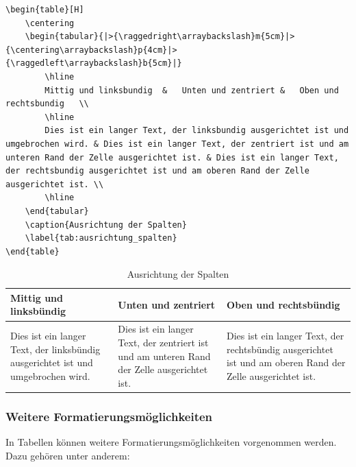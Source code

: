 \begin{lstlisting}[language={[LaTeX]TeX}, basicstyle=\footnotesize\ttfamily]
\begin{table}[H]
    \centering
    \begin{tabular}{|>{\raggedright\arraybackslash}m{5cm}|>{\centering\arraybackslash}p{4cm}|>{\raggedleft\arraybackslash}b{5cm}|}
        \hline
        Mittig und linksbundig  &   Unten und zentriert &   Oben und rechtsbundig   \\
        \hline
        Dies ist ein langer Text, der linksbundig ausgerichtet ist und umgebrochen wird. & Dies ist ein langer Text, der zentriert ist und am unteren Rand der Zelle ausgerichtet ist. & Dies ist ein langer Text, der rechtsbundig ausgerichtet ist und am oberen Rand der Zelle ausgerichtet ist. \\
        \hline
    \end{tabular}
    \caption{Ausrichtung der Spalten}
    \label{tab:ausrichtung_spalten}
\end{table}
\end{lstlisting}

\begin{table}[H]
    \centering
    \begin{tabular}{|>{\raggedright\arraybackslash}m{5cm}|>{\centering\arraybackslash}p{4cm}|>{\raggedleft\arraybackslash}b{5cm}|}
        \hline
        \textbf{Mittig und linksbündig}                                                  & \textbf{Unten und zentriert}                                                                & \textbf{Oben und rechtsbündig}                                                                             \\
        \hline
        Dies ist ein langer Text, der linksbündig ausgerichtet ist und umgebrochen wird. & Dies ist ein langer Text, der zentriert ist und am unteren Rand der Zelle ausgerichtet ist. & Dies ist ein langer Text, der rechtsbündig ausgerichtet ist und am oberen Rand der Zelle ausgerichtet ist. \\
        \hline
    \end{tabular}
    \caption{Ausrichtung der Spalten}
    \label{tab:ausrichtung_spalten}
\end{table}

\subsubsection{Weitere Formatierungsmöglichkeiten}
In Tabellen können weitere Formatierungsmöglichkeiten vorgenommen werden. Dazu gehören unter anderem:

